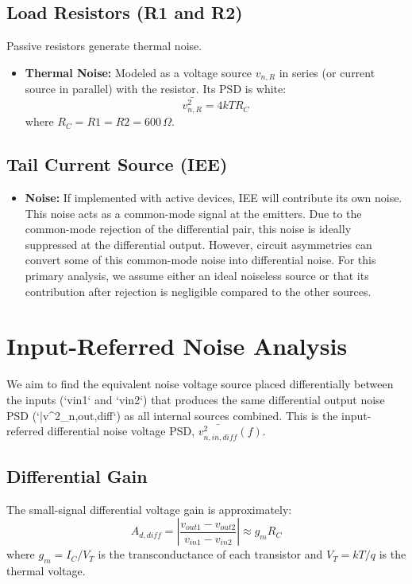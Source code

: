 \documentclass[11pt]{article}
\begin{document}
\subsection{Load Resistors (R1 and R2)}
Passive resistors generate thermal noise.
\begin{itemize}
    \item \textbf{Thermal Noise:} Modeled as a voltage source $v_{n,R}$ in series (or current source in parallel) with the resistor. Its PSD is white:
    \begin{equation}
        \bar{v^2_{n,R}} = 4 k T R_C
    \end{equation}
    where $R_C = R1 = R2 = 600\,\Omega$.
\end{itemize}

\subsection{Tail Current Source (IEE)}
\begin{itemize}
    \item \textbf{Noise:} If implemented with active devices, IEE will contribute its own noise. This noise acts as a common-mode signal at the emitters. Due to the common-mode rejection of the differential pair, this noise is ideally suppressed at the differential output. However, circuit asymmetries can convert some of this common-mode noise into differential noise. For this primary analysis, we assume either an ideal noiseless source or that its contribution after rejection is negligible compared to the other sources.
\end{itemize}

\section{Input-Referred Noise Analysis}

We aim to find the equivalent noise voltage source placed differentially between the inputs (`vin1` and `vin2`) that produces the same differential output noise PSD (`\bar{v^2_{n,out,diff}}`) as all internal sources combined. This is the input-referred differential noise voltage PSD, $\bar{v^2_{n,in,diff}}(f)$.

\subsection{Differential Gain}
The small-signal differential voltage gain is approximately:
\begin{equation}
    A_{d,diff} = \left| \frac{v_{out1} - v_{out2}}{v_{in1} - v_{in2}} \right| \approx g_m R_C
\end{equation}
where $g_m = I_C / V_T$ is the transconductance of each transistor and $V_T = kT/q$ is the thermal voltage.
\end{document}
